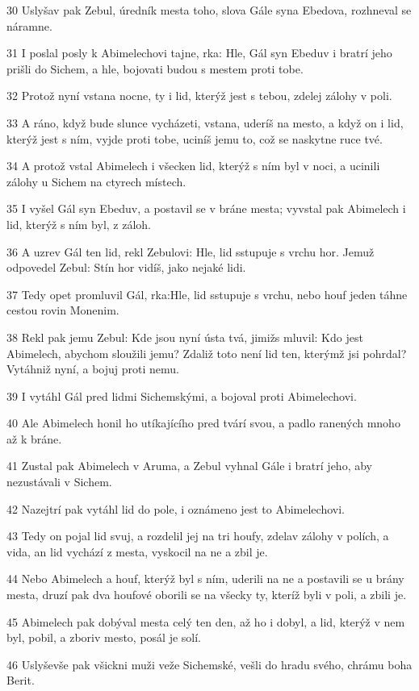 \par 30 Uslyšav pak Zebul, úredník mesta toho, slova Gále syna Ebedova, rozhneval se náramne.
\par 31 I poslal posly k Abimelechovi tajne, rka: Hle, Gál syn Ebeduv i bratrí jeho prišli do Sichem, a hle, bojovati budou s mestem proti tobe.
\par 32 Protož nyní vstana nocne, ty i lid, kterýž jest s tebou, zdelej zálohy v poli.
\par 33 A ráno, když bude slunce vycházeti, vstana, uderíš na mesto, a když on i lid, kterýž jest s ním, vyjde proti tobe, uciníš jemu to, což se naskytne ruce tvé.
\par 34 A protož vstal Abimelech i všecken lid, kterýž s ním byl v noci, a ucinili zálohy u Sichem na ctyrech místech.
\par 35 I vyšel Gál syn Ebeduv, a postavil se v bráne mesta; vyvstal pak Abimelech i lid, kterýž s ním byl, z záloh.
\par 36 A uzrev Gál ten lid, rekl Zebulovi: Hle, lid sstupuje s vrchu hor. Jemuž odpovedel Zebul: Stín hor vidíš, jako nejaké lidi.
\par 37 Tedy opet promluvil Gál, rka:Hle, lid sstupuje s vrchu, nebo houf jeden táhne cestou rovin Monenim.
\par 38 Rekl pak jemu Zebul: Kde jsou nyní ústa tvá, jimižs mluvil: Kdo jest Abimelech, abychom sloužili jemu? Zdaliž toto není lid ten, kterýmž jsi pohrdal? Vytáhniž nyní, a bojuj proti nemu.
\par 39 I vytáhl Gál pred lidmi Sichemskými, a bojoval proti Abimelechovi.
\par 40 Ale Abimelech honil ho utíkajícího pred tvárí svou, a padlo ranených mnoho až k bráne.
\par 41 Zustal pak Abimelech v Aruma, a Zebul vyhnal Gále i bratrí jeho, aby nezustávali v Sichem.
\par 42 Nazejtrí pak vytáhl lid do pole, i oznámeno jest to Abimelechovi.
\par 43 Tedy on pojal lid svuj, a rozdelil jej na tri houfy, zdelav zálohy v polích, a vida, an lid vychází z mesta, vyskocil na ne a zbil je.
\par 44 Nebo Abimelech a houf, kterýž byl s ním, uderili na ne a postavili se u brány mesta, druzí pak dva houfové oborili se na všecky ty, kteríž byli v poli, a zbili je.
\par 45 Abimelech pak dobýval mesta celý ten den, až ho i dobyl, a lid, kterýž v nem byl, pobil, a zboriv mesto, posál je solí.
\par 46 Uslyševše pak všickni muži veže Sichemské, vešli do hradu svého, chrámu boha Berit.
